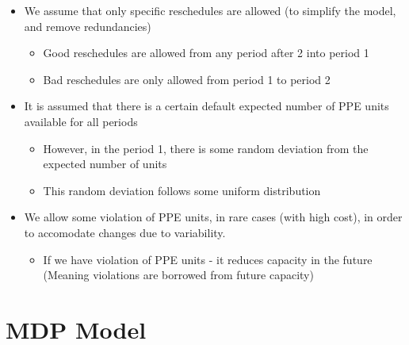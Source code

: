 \documentclass{article}
\begin{document}
\begin{itemize}
	\item We assume that only specific reschedules are allowed (to simplify the model, and remove  redundancies)
	\begin{itemize}
		\item Good reschedules are allowed from any period after 2 into period 1
		\item Bad reschedules are only allowed from period 1 to period 2
	\end{itemize}
	
	\item It is assumed that there is a certain default expected number of PPE units available for all periods
	\begin{itemize}
		\item However, in the period 1, there is some random deviation from the expected number of units
		\item This random deviation follows some uniform distribution
	\end{itemize}
	\item We allow some violation of PPE units, in rare cases (with high cost), in order to accomodate changes due to variability.
	\begin{itemize}
		\item If we have violation of PPE units - it reduces capacity in the future (Meaning violations are borrowed from future capacity)
	\end{itemize}
\end{itemize}


\section{MDP Model}
\end{document}
